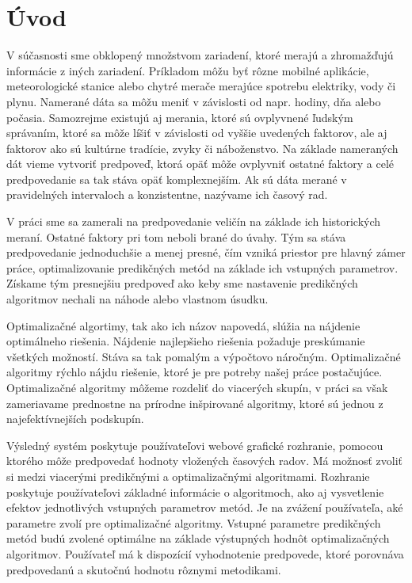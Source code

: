 \documentclass[a4paper,slovak,12pt,appendix]{article}
\begin{document}
\section{Úvod}
V súčasnosti sme obklopený množstvom zariadení, ktoré merajú a zhromažďujú
informácie z iných zariadení. Príkladom môžu byť rôzne mobilné aplikácie,
meteorologické stanice alebo chytré merače merajúce spotrebu elektriky, vody
či plynu. Namerané dáta sa môžu meniť v závislosti od napr. hodiny, dňa alebo
počasia. Samozrejme existujú aj merania, ktoré sú ovplyvnené ľudským správaním,
ktoré sa môže líšiť v závislosti od vyššie uvedených faktorov, ale aj faktorov
ako sú kultúrne tradície, zvyky či náboženstvo. Na základe nameraných dát vieme
vytvoriť predpoveď, ktorá opäť môže ovplyvniť ostatné faktory a celé
predpovedanie sa tak stáva opäť komplexnejším. Ak sú dáta merané v pravidelných
intervaloch a konzistentne, nazývame ich časový rad.

V práci sme sa zamerali na predpovedanie veličín na základe ich historických
meraní. Ostatné faktory pri tom neboli brané do úvahy. Tým sa stáva
predpovedanie jednoduchšie a menej presné, čím vzniká priestor pre hlavný zámer
práce, optimalizovanie predikčných metód na základe ich vstupných parametrov.
Získame tým presnejšiu predpoveď ako keby sme nastavenie predikčných algoritmov
nechali na náhode alebo vlastnom úsudku.

Optimalizačné algortimy, tak ako ich názov napovedá, slúžia na nájdenie
optimálneho riešenia. Nájdenie najlepšieho riešenia požaduje preskúmanie
všetkých možností. Stáva sa tak pomalým a výpočtovo náročným. Optimalizačné
algoritmy rýchlo nájdu riešenie, ktoré je pre potreby našej práce postačujúce.
Optimalizačné algoritmy môžeme rozdeliť do viacerých skupín, v práci sa však
zameriavame prednostne na prírodne inšpirované algoritmy, ktoré sú jednou
z najefektívnejších podskupín.

Výsledný systém poskytuje používateľovi webové grafické rozhranie, pomocou
ktorého môže predpovedať hodnoty vložených časových radov. Má možnosť zvoliť si
medzi viacerými predikčnými a optimalizačnými algoritmami. Rozhranie poskytuje
používateľovi základné informácie o algoritmoch, ako aj vysvetlenie efektov
jednotlivých vstupných parametrov metód. Je na zvážení používateľa, aké
parametre zvolí pre optimalizačné algoritmy. Vstupné parametre predikčných
metód budú zvolené optimálne na základe výstupných hodnôt optimalizačných
algoritmov. Používateľ má k dispozícií vyhodnotenie predpovede, ktoré porovnáva
predpovedanú a skutočnú hodnotu rôznymi metodikami.
\end{document}

